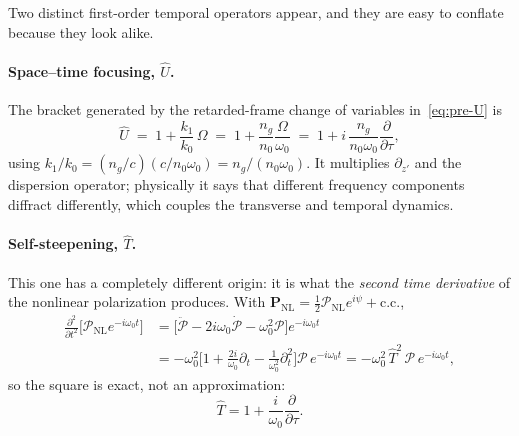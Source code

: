 \documentclass[11pt,a4paper]{article}
\begin{document}
Two distinct first-order temporal operators appear, and they are easy to
conflate because they look alike.

\paragraph{Space--time focusing, $\hat U$.} The bracket generated by the
retarded-frame change of variables in~\eqref{eq:pre-U} is
\begin{equation}
\label{eq:U-def}
\hat U \;=\; 1+\frac{k_1}{k_0}\,\Omega
 \;=\; 1+\frac{n_g}{n_0}\frac{\Omega}{\omega_0}
 \;=\; 1+i\,\frac{n_g}{n_0\omega_0}\frac{\partial}{\partial\tau},
\end{equation}
using $k_1/k_0=(n_g/c)(c/n_0\omega_0)=n_g/(n_0\omega_0)$. It multiplies
$\partial_{z'}$ and the dispersion operator; physically it says that different
frequency components diffract differently, which couples the transverse and
temporal dynamics.

\paragraph{Self-steepening, $\hat T$.} This one has a completely different
origin: it is what the \emph{second time derivative} of the nonlinear
polarization produces. With
$\mathbf{P}_{\text{NL}}=\tfrac12\mathcal{P}_{\text{NL}}e^{i\psi}+\mathrm{c.c.}$,
\begin{align}
\frac{\partial^2}{\partial t^2}\Big[\mathcal{P}_{\text{NL}}e^{-i\omega_0 t}\Big]
&= \Big[\ddot{\mathcal{P}}-2i\omega_0\dot{\mathcal{P}}-\omega_0^2\mathcal{P}\Big]e^{-i\omega_0t}
\nonumber\\
&= -\omega_0^2\Big[1+\frac{2i}{\omega_0}\partial_t-\frac{1}{\omega_0^2}\partial_t^2\Big]
   \mathcal{P}\,e^{-i\omega_0t}
 = -\omega_0^2\,\hat T^2\,\mathcal{P}\,e^{-i\omega_0 t},
\end{align}
so the square is exact, not an approximation:
\begin{equation}
\label{eq:T-def}
\hat T = 1+\frac{i}{\omega_0}\frac{\partial}{\partial\tau}.
\end{equation}
\end{document}
